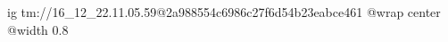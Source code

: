  
 
 
 
 

\qqSecOrig


\ifcmt
  ig tm://16_12_22.11.05.59@2a988554c6986c27f6d54b23eabce461
  @wrap center
  @width 0.8
\fi


